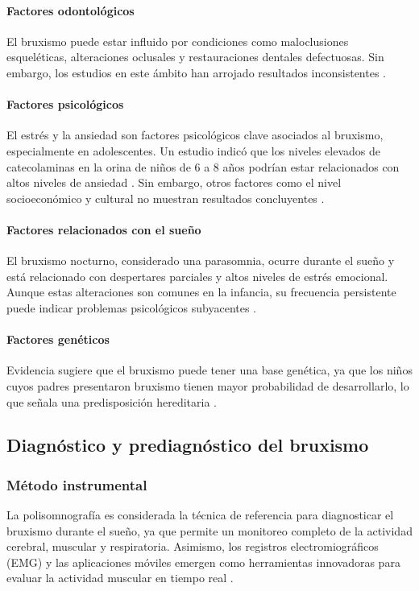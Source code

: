 \paragraph{Factores odontológicos}  
El bruxismo puede estar influido por condiciones como maloclusiones esqueléticas, alteraciones oclusales y restauraciones dentales defectuosas. Sin embargo, los estudios en este ámbito han arrojado resultados inconsistentes \parencite{Zambra2003}.

\paragraph{Factores psicológicos}  
El estrés y la ansiedad son factores psicológicos clave asociados al bruxismo, especialmente en adolescentes. Un estudio indicó que los niveles elevados de catecolaminas en la orina de niños de 6 a 8 años podrían estar relacionados con altos niveles de ansiedad \parencite{vanderas1999catecholaminebruxism}. Sin embargo, otros factores como el nivel socioeconómico y cultural no muestran resultados concluyentes \parencite{serranegra2009psychosocialbruxism}.

\paragraph{Factores relacionados con el sueño}  
El bruxismo nocturno, considerado una parasomnia, ocurre durante el sueño y está relacionado con despertares parciales y altos niveles de estrés emocional. Aunque estas alteraciones son comunes en la infancia, su frecuencia persistente puede indicar problemas psicológicos subyacentes \parencite{vieiraandrade2014sleepbruxism}.

\paragraph{Factores genéticos}  
Evidencia sugiere que el bruxismo puede tener una base genética, ya que los niños cuyos padres presentaron bruxismo tienen mayor probabilidad de desarrollarlo, lo que señala una predisposición hereditaria \parencite{hublin2001parasomniasgenetics}.

\subsection{Diagnóstico y prediagnóstico del bruxismo}

\subsubsection{Método instrumental}  
La polisomnografía es considerada la técnica de referencia para diagnosticar el bruxismo durante el sueño, ya que permite un monitoreo completo de la actividad cerebral, muscular y respiratoria. Asimismo, los registros electromiográficos (EMG) y las aplicaciones móviles emergen como herramientas innovadoras para evaluar la actividad muscular en tiempo real \parencite{gutierrez2021bruxismorino}.

